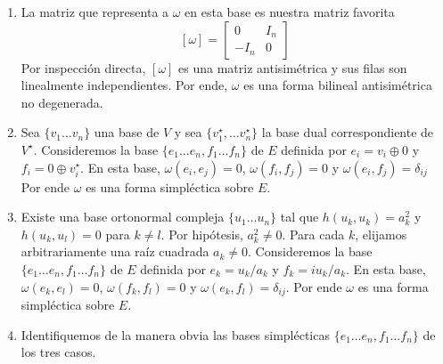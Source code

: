 \begin{solution}
\leavevmode
\begin{enumerate}
    \item La matriz que representa a $\omega$ en esta base es nuestra matriz favorita
    $$[\omega] = \begin{bmatrix} 0 & I_n \\ -I_n & 0 \end{bmatrix}$$
    Por inspección directa, $[\omega]$ es una matriz antisimétrica y sus filas son linealmente independientes. Por ende, $\omega$ es una forma bilineal antisimétrica no degenerada.
    
    \item Sea $\{ v_1 \dots v_n \}$ una base de $V$ y sea $\{ v_1^\star, \dots v_n^\star \}$ la base dual correspondiente de $V^\star$. Consideremos la base $\{ e_1 \dots e_n, f_1 \dots f_n \}$ de $E$ definida por $e_i = v_i \oplus 0$ y $f_i = 0 \oplus v_i^\star$. En esta base, $\omega(e_i, e_j) = 0$, $\omega(f_i, f_j) = 0$ y $\omega(e_i, f_j) = \delta_{ij}$ Por ende $\omega$ es una forma simpléctica sobre $E$.
    
    \item Existe una base ortonormal compleja $\{ u_1 \dots u_n \}$ tal que $h(u_k, u_k) = a_k^2$ y $h(u_k, u_l) = 0$ para $k \ne l$. Por hipótesis, $a_k^2 \ne 0$. Para cada $k$, elijamos arbitrariamente una raíz cuadrada $a_k \ne 0$. Consideremos la base $\{ e_1 \dots e_n, f_1 \dots f_n \}$ de $E$ definida por $e_k = u_k / a_k$ y $f_k = i u_k / a_k$. En esta base, $\omega(e_k, e_l) = 0$, $\omega(f_k, f_l) = 0$ y $\omega(e_k, f_l) = \delta_{ij}$. Por ende $\omega$ es una forma simpléctica sobre $E$.
    
    \item Identifiquemos de la manera obvia las bases simplécticas $\{ e_1 \dots e_n, f_1 \dots f_n \}$ de los tres casos.
\end{enumerate}
\end{solution}
